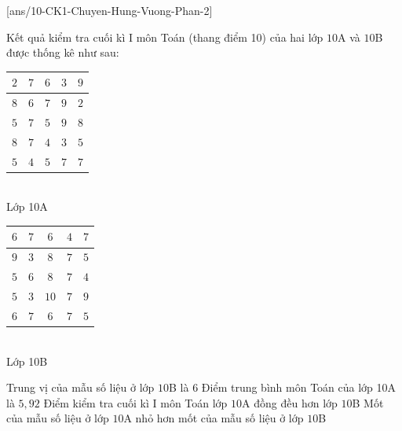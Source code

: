 \cauds
{}[ans/10-CK1-Chuyen-Hung-Vuong-Phan-2]
\begin{ex}%
Kết quả kiểm tra cuối kì I môn Toán (thang điểm 10) của hai lớp $10$A và $10$B được thống kê như sau:\\
	\begin{minipage}{7cm}
		{\begin{center}
			\begin{tabular}{|c|c|c|c|c|}
				\hline
				$2$ & $7$ & $6$ & $3$ & $9$ \\
				\hline
				$8$ & $6$ & $7$ & $9$ & $2$ \\
				\hline
				$5$ & $7$ & $5$ & $9$ & $8$ \\
				\hline
				$8$ & $7$ & $4$ & $3$ & $5$ \\
				\hline
				$5$ & $4$ & $5$ & $7$ & $7$ \\
				\hline
			\end{tabular}
			\\ Lớp 10A
		\end{center}			
		}
	\end{minipage}
	\begin{minipage}{7cm}
		{\begin{center}
			\begin{tabular}{|c|c|c|c|c|}
				\hline
				$6$ & $7$ & $6$ & $4$ & $7$\\
				\hline
				$9$ & $3$ & $8$ & $7$ & $5$\\
				\hline
				$5$ & $6$ & $8$ & $7$ & $4$\\
				\hline
				$5$ & $3$ & $10$ & $7$ & $9$\\
				\hline
				$6$ & $7$ & $6$ & $7$ & $5$\\
				\hline
			\end{tabular}
			\\ Lớp 10B
		\end{center}
		}
	\end{minipage}
	\choiceTF
		{\True Trung vị của mẫu số liệu ở lớp $10$B là $6$}
		{\True Điểm trung bình môn Toán của lớp 10A là $5{,}92$}
		{Điểm kiểm tra cuối kì I môn Toán lớp $10$A đồng đều hơn lớp $10$B}
		{Mốt của mẫu số liệu ở lớp $10$A nhỏ hơn mốt của mẫu số liệu ở lớp $10$B}
\end{ex}
